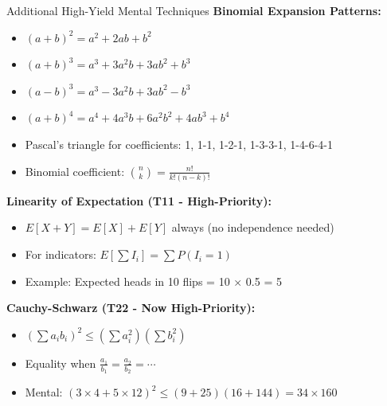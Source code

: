 \documentclass{article}
\begin{document}
\begin{mentalbox}{Additional High-Yield Mental Techniques}
\textbf{Binomial Expansion Patterns:}
\begin{itemize}[nosep]
\item $(a+b)^2 = a^2 + 2ab + b^2$
\item $(a+b)^3 = a^3 + 3a^2b + 3ab^2 + b^3$
\item $(a-b)^3 = a^3 - 3a^2b + 3ab^2 - b^3$
\item $(a+b)^4 = a^4 + 4a^3b + 6a^2b^2 + 4ab^3 + b^4$
\item Pascal's triangle for coefficients: 1, 1-1, 1-2-1, 1-3-3-1, 1-4-6-4-1
\item Binomial coefficient: $\binom{n}{k} = \frac{n!}{k!(n-k)!}$
\end{itemize}

\textbf{Linearity of Expectation (T11 - High-Priority):}
\begin{itemize}[nosep]
\item $E[X + Y] = E[X] + E[Y]$ always (no independence needed)
\item For indicators: $E[\sum I_i] = \sum P(I_i = 1)$
\item Example: Expected heads in 10 flips = 10 × 0.5 = 5
\end{itemize}

\textbf{Cauchy-Schwarz (T22 - Now High-Priority):}
\begin{itemize}[nosep]
\item $(\sum a_i b_i)^2 \leq (\sum a_i^2)(\sum b_i^2)$
\item Equality when $\frac{a_1}{b_1} = \frac{a_2}{b_2} = \cdots$
\item Mental: $(3\times4 + 5\times12)^2 \leq (9+25)(16+144) = 34\times160$
\end{itemize}
\end{mentalbox}
\end{document}
